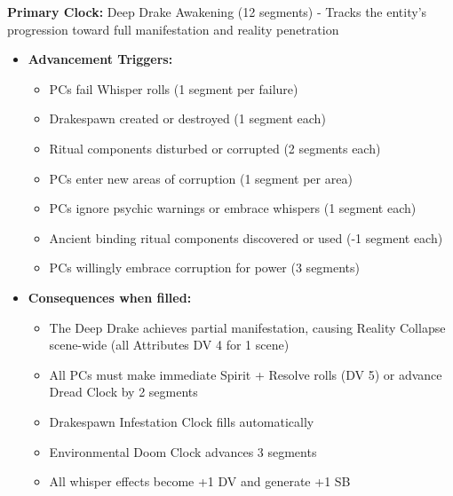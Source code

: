 \documentclass[11pt]{article}
\begin{document}
\textbf{Primary Clock:} Deep Drake Awakening (12 segments) - Tracks the entity's progression toward full manifestation and reality penetration
\begin{itemize}
\item \textbf{Advancement Triggers:}
  \begin{itemize}
  \item PCs fail Whisper rolls (1 segment per failure)
  \item Drakespawn created or destroyed (1 segment each)
  \item Ritual components disturbed or corrupted (2 segments each)
  \item PCs enter new areas of corruption (1 segment per area)
  \item PCs ignore psychic warnings or embrace whispers (1 segment each)
  \item Ancient binding ritual components discovered or used (-1 segment each)
  \item PCs willingly embrace corruption for power (3 segments)
  \end{itemize}
\item \textbf{Consequences when filled:}
  \begin{itemize}
  \item The Deep Drake achieves partial manifestation, causing Reality Collapse scene-wide (all Attributes DV 4 for 1 scene)
  \item All PCs must make immediate Spirit + Resolve rolls (DV 5) or advance Dread Clock by 2 segments
  \item Drakespawn Infestation Clock fills automatically
  \item Environmental Doom Clock advances 3 segments
  \item All whisper effects become +1 DV and generate +1 SB
  \end{itemize}
\end{itemize}
\end{document}
